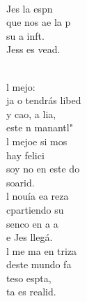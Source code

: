\documentclass[12pt]{article}
\begin{document}
\begin{multicols*}{2}
\begin{cancion}%
	\begin{chorus}%
	       \\
	 Jes la espn\\
	que nos ae la p\\
	 su a inft.\\
	Jess es vead.\\
	\end{chorus}%
	\jump\\
	l mejo:\\
	ja o tendrás libed\\
	y cao, a lia, \\
	 este n manantl"\\
	l mejoe si mos\\
	 hay felici\\
	 soy no en este do\\
	 soarid.\\
\jump
	l nouía ea reza\\
	cpartiendo su \\
	 senco en a a \\
	e Jes llegá.\\
	l me ma en triza\\
	deste mundo fa\\
	 teso espta, \\
	ta es realid.\\
\end{cancion}%


\end{multicols*}
\end{document}
